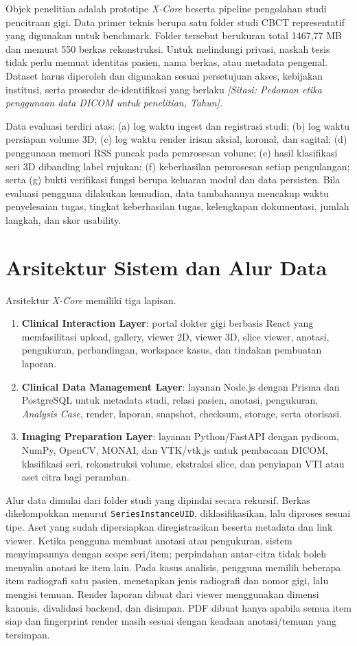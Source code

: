 \documentclass[12pt,a4paper,oneside]{report}
\newcommand{\sitasi}[1]{\textit{[Sitasi: #1]}}
\newcommand{\xcore}{\textit{X-Core}}
\begin{document}
Objek penelitian adalah prototipe \xcore{} beserta pipeline pengolahan studi pencitraan gigi. Data primer teknis berupa satu folder studi CBCT representatif yang digunakan untuk benchmark. Folder tersebut berukuran total 1467,77 MB dan memuat 550 berkas rekonstruksi. Untuk melindungi privasi, naskah tesis tidak perlu memuat identitas pasien, nama berkas, atau metadata pengenal. Dataset harus diperoleh dan digunakan sesuai persetujuan akses, kebijakan institusi, serta prosedur de-identifikasi yang berlaku \sitasi{Pedoman etika penggunaan data DICOM untuk penelitian, Tahun}.

Data evaluasi terdiri atas: (a) log waktu ingest dan registrasi studi; (b) log waktu persiapan volume 3D; (c) log waktu render irisan aksial, koronal, dan sagital; (d) penggunaan memori RSS puncak pada pemrosesan volume; (e) hasil klasifikasi seri 3D dibanding label rujukan; (f) keberhasilan pemrosesan setiap pengulangan; serta (g) bukti verifikasi fungsi berupa keluaran modul dan data persisten. Bila evaluasi pengguna dilakukan kemudian, data tambahannya mencakup waktu penyelesaian tugas, tingkat keberhasilan tugas, kelengkapan dokumentasi, jumlah langkah, dan skor usability.

\section{Arsitektur Sistem dan Alur Data}

Arsitektur \xcore{} memiliki tiga lapisan.
\begin{enumerate}[label=\arabic*.]
  \item \textbf{Clinical Interaction Layer}: portal dokter gigi berbasis React yang memfasilitasi upload, gallery, viewer 2D, viewer 3D, slice viewer, anotasi, pengukuran, perbandingan, workspace kasus, dan tindakan pembuatan laporan.
  \item \textbf{Clinical Data Management Layer}: layanan Node.js dengan Prisma dan PostgreSQL untuk metadata studi, relasi pasien, anotasi, pengukuran, \textit{Analysis Case}, render, laporan, snapshot, checksum, storage, serta otorisasi.
  \item \textbf{Imaging Preparation Layer}: layanan Python/FastAPI dengan pydicom, NumPy, OpenCV, MONAI, dan VTK/vtk.js untuk pembacaan DICOM, klasifikasi seri, rekonstruksi volume, ekstraksi slice, dan penyiapan VTI atau aset citra bagi peramban.
\end{enumerate}

Alur data dimulai dari folder studi yang dipindai secara rekursif. Berkas dikelompokkan menurut \texttt{SeriesInstanceUID}, diklasifikasikan, lalu diproses sesuai tipe. Aset yang sudah dipersiapkan diregistrasikan beserta metadata dan link viewer. Ketika pengguna membuat anotasi atau pengukuran, sistem menyimpannya dengan scope seri/item; perpindahan antar-citra tidak boleh menyalin anotasi ke item lain. Pada kasus analisis, pengguna memilih beberapa item radiografi satu pasien, menetapkan jenis radiografi dan nomor gigi, lalu mengisi temuan. Render laporan dibuat dari viewer menggunakan dimensi kanonis, divalidasi backend, dan disimpan. PDF dibuat hanya apabila semua item siap dan fingerprint render masih sesuai dengan keadaan anotasi/temuan yang tersimpan.
\end{document}
